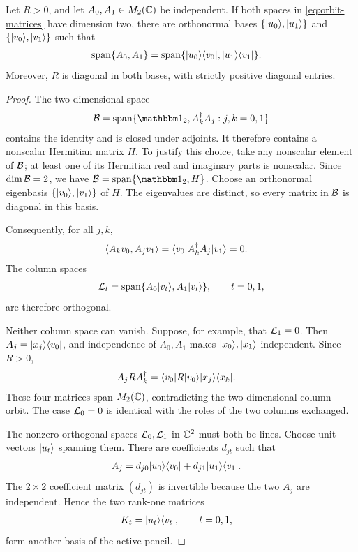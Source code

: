 \begin{lemma}
	\label{lem:pencil}
	Let $R>0$, and let $A_0,A_1\in M_2(\mathbb{C})$ be independent.
	If both spaces in \cref{eq:orbit-matrices} have dimension two,
	there are orthonormal bases $\{\lvert u_0\rangle,\lvert u_1\rangle\}$ and
	$\{\lvert v_0\rangle,\lvert v_1\rangle\}$ such that
	\begin{align}
		\operatorname{span}\{A_0,A_1\}
		 & =\operatorname{span}
		\{\lvert u_0\rangle\langle v_0\rvert,\lvert u_1\rangle\langle v_1\rvert\}.
		\label{eq:pencil}
	\end{align}
	Moreover, $R$ is diagonal in both bases, with strictly positive
	diagonal entries.
\end{lemma}

\begin{proof}
	The two-dimensional space
	\begin{align}
		\mc B=\operatorname{span}
		\{\Id_2,A_k^\dagger A_j:j,k=0,1\}
	\end{align}
	contains the identity and is closed under adjoints.
	It therefore contains a nonscalar Hermitian matrix $H$.
	To justify this choice, take any nonscalar element of $\mathcal{B}$;
	at least one of its Hermitian real and imaginary parts is nonscalar.
	Since $\dim\mathcal{B}=2$, we have
	$\mc B=\operatorname{span}\{\Id_2,H\}$.
	Choose an orthonormal eigenbasis $\{\lvert v_0\rangle,\lvert v_1\rangle\}$ of $H$.
	The eigenvalues are distinct, so every matrix in $\mathcal{B}$ is diagonal
	in this basis.

	Consequently, for all $j,k$,
	\begin{align}
		\langle A_kv_0,A_jv_1\rangle
		 & =\langle v_0\rvert A_k^\dagger A_j\lvert v_1\rangle=0.
		\label{eq:column-orthogonality}
	\end{align}
	The column spaces
	\begin{align}
		\mathcal{L}_t=\operatorname{span}\{A_0\lvert v_t\rangle,A_1\lvert v_t\rangle\},
		\qquad t=0,1,
	\end{align}
	are therefore orthogonal.

	Neither column space can vanish. Suppose, for example, that
	$\mathcal{L}_1=0$. Then
	$A_j=\lvert x_j\rangle\langle v_0\rvert$, and independence of $A_0,A_1$ makes
	$\lvert x_0\rangle,\lvert x_1\rangle$ independent. Since $R>0$,
	\begin{align}
		A_jRA_k^\dagger
		 & =\langle v_0\rvert R\lvert v_0\rangle\lvert x_j\rangle\langle x_k\rvert.
	\end{align}
	These four matrices span $M_2(\mathbb{C})$, contradicting the
	two-dimensional column orbit. The case $\mathcal{L}_0=0$ is identical
	with the roles of the two columns exchanged.

	The nonzero orthogonal spaces $\mathcal{L}_0,\mathcal{L}_1$ in $\mathbb{C}^2$ must
	both be lines. Choose unit vectors $\lvert u_t\rangle$ spanning them.
	There are coefficients $d_{jt}$ such that
	\begin{align}
		A_j
		 & =d_{j0}\lvert u_0\rangle\langle v_0\rvert
		+d_{j1}\lvert u_1\rangle\langle v_1\rvert.
		\label{eq:pencil-coefficients}
	\end{align}
	The $2\times2$ coefficient matrix $(d_{jt})$ is invertible because
	the two $A_j$ are independent. Hence the two rank-one matrices
	\begin{align}
		K_t & =\lvert u_t\rangle\langle v_t\rvert,\qquad t=0,1,
	\end{align}
	form another basis of the active pencil.


\end{proof}
